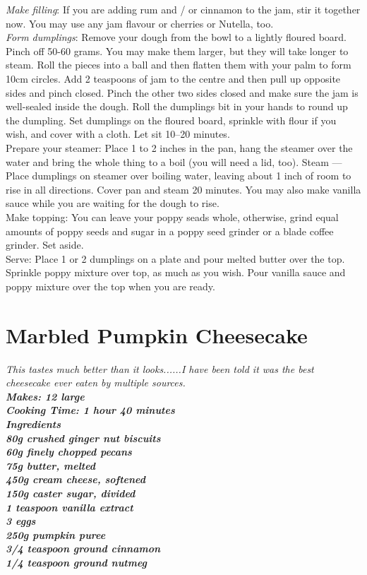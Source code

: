 \documentclass[18pt, oneside]{book}
\begin{document}
\textit{Make filling}: If you are adding rum and / or cinnamon to the jam, stir it together now. You may use any jam flavour or cherries or Nutella, too. \\

\textit{Form dumplings}: Remove your dough from the bowl to a lightly floured board. Pinch off 50-60 grams. You may make them larger, but they will take longer to steam. Roll the pieces into a ball and then flatten them with your palm to form 10cm circles. Add 2 teaspoons of jam to the centre and then pull up opposite sides and pinch closed. Pinch the other two sides closed and make sure the jam is well-sealed inside the dough. Roll the dumplings bit in your hands to round up the dumpling. Set dumplings on the floured board, sprinkle with flour if you wish, and cover with a cloth. Let sit 10--20 minutes. \\

Prepare your steamer: Place 1 to 2 inches in the pan, hang the steamer over the water and bring the whole thing to a boil (you will need a lid, too). Steam --- Place dumplings on steamer over boiling water, leaving about 1 inch of room to rise in all directions. Cover pan and steam 20 minutes. You may also make vanilla sauce while you are waiting for the dough to rise.\\

Make topping: You can leave your poppy seads whole, otherwise, grind equal amounts of poppy seeds and sugar in a poppy seed grinder or a blade coffee grinder. Set aside. \\

Serve: Place 1 or 2 dumplings on a plate and pour melted butter over the top. Sprinkle poppy mixture over top, as much as you wish. Pour vanilla sauce and poppy mixture over the top when you are ready.

\section{Marbled Pumpkin Cheesecake}

\it{This tastes much better than it looks......I have been told it was the best cheesecake ever eaten by multiple sources.} \\

\bf{Makes: 12 large} \\
\bf{Cooking Time: 1 hour 40 minutes} \\

\bf{Ingredients} \normalfont \\ 
80g crushed ginger nut biscuits \\
60g finely chopped pecans \\
75g butter, melted \\
450g cream cheese, softened \\
150g caster sugar, divided \\
1 teaspoon vanilla extract \\
3 eggs \\
250g pumpkin puree \\
3/4 teaspoon ground cinnamon \\
1/4 teaspoon ground nutmeg \\
\end{document}

